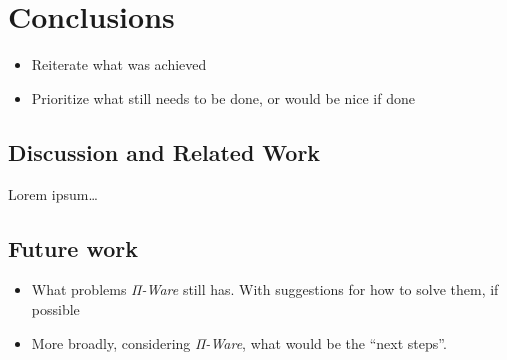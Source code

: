\chapter{Conclusions}
\label{chap:conclusions}
    \begin{itemize}
        \item Reiterate what was achieved
        \item Prioritize what still needs to be done, or would be nice if done
    \end{itemize}

    \section{Discussion and Related Work}
    \label{sec:related-work}
        Lorem ipsum\ldots

    \section{Future work}
    \label{sec:future-work}
        \begin{itemize}
            \item What problems \emph{Π-Ware} still has.
                \subitem With suggestions for how to solve them, if possible

            \item More broadly, considering \emph{Π-Ware}, what would be the ``next steps''.
        \end{itemize}
